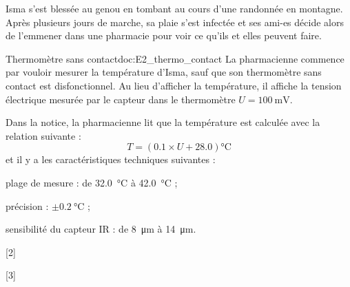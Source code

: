 

Isma s'est blessée au genou en tombant au cours d'une randonnée en montagne.
Après plusieurs jours de marche, sa plaie s'est infectée et ses ami-es décide alors de l'emmener dans une pharmacie pour voir ce qu'ils et elles peuvent faire.



\begin{doc}{Thermomètre sans contact}{doc:E2_thermo_contact}
  La pharmacienne commence par vouloir mesurer la température d'Isma, sauf que son thermomètre sans contact est disfonctionnel.
  Au lieu d'afficher la température, il affiche la tension électrique mesurée par le capteur dans le thermomètre $U = \qty{100}{\milli\volt}$.
  
  Dans la notice, la pharmacienne lit que la température est calculée avec la relation suivante : 
  \begin{equation*}
    T = (\num{0,1}\times U + \num{28,0}) \unit{\degreeCelsius}
  \end{equation*}
  et il y a les caractéristiques techniques suivantes :
    \begin{listePoints}
      \item plage de mesure : de \qty{32,0}{\degreeCelsius} à \qty{42,0}{\degreeCelsius} ;
      \item précision : $\pm \qty{0,2}{\degreeCelsius}$ ;
      \item sensibilité du capteur IR : de \qty{8}{\micro\m} à \qty{14}{\micro\m}.
    \end{listePoints}
\end{doc}

[2]

\pasCorrection{
  \newpage
  \vspace*{-8pt}
}
[3]


